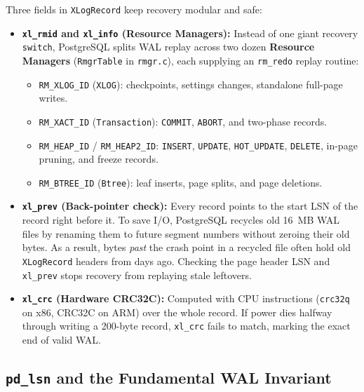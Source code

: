 Three fields in \texttt{XLogRecord} keep recovery modular and safe:
\begin{itemize}
  \item \textbf{\texttt{xl\_rmid} and \texttt{xl\_info} (Resource Managers):} Instead of one giant recovery \texttt{switch}, PostgreSQL splits WAL replay across two dozen \textbf{Resource Managers} (\texttt{RmgrTable} in \texttt{rmgr.c}), each supplying an \texttt{rm\_redo} replay routine:
    \begin{itemize}
      \item \texttt{RM\_XLOG\_ID} (\texttt{XLOG}): checkpoints, settings changes, standalone full-page writes.
      \item \texttt{RM\_XACT\_ID} (\texttt{Transaction}): \texttt{COMMIT}, \texttt{ABORT}, and two-phase records.
      \item \texttt{RM\_HEAP\_ID} / \texttt{RM\_HEAP2\_ID}: \texttt{INSERT}, \texttt{UPDATE}, \texttt{HOT\_UPDATE}, \texttt{DELETE}, in-page pruning, and freeze records.
      \item \texttt{RM\_BTREE\_ID} (\texttt{Btree}): leaf inserts, page splits, and page deletions.
    \end{itemize}
  \item \textbf{\texttt{xl\_prev} (Back-pointer check):} Every record points to the start LSN of the record right before it. To save I/O, PostgreSQL recycles old 16~MB WAL files by renaming them to future segment numbers without zeroing their old bytes. As a result, bytes \emph{past} the crash point in a recycled file often hold old \texttt{XLogRecord} headers from days ago. Checking the page header LSN and \texttt{xl\_prev} stops recovery from replaying stale leftovers.
  \item \textbf{\texttt{xl\_crc} (Hardware CRC32C):} Computed with CPU instructions (\texttt{crc32q} on x86, CRC32C on ARM) over the whole record. If power dies halfway through writing a 200-byte record, \texttt{xl\_crc} fails to match, marking the exact end of valid WAL.
\end{itemize}

\subsection{\texttt{pd\_lsn} and the Fundamental WAL Invariant}

